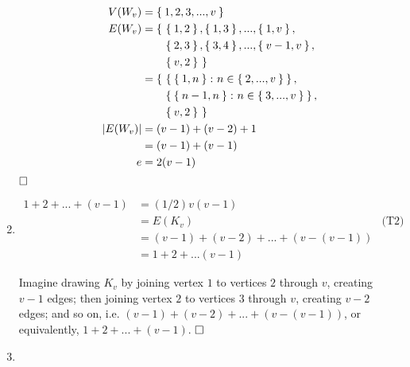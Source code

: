 \documentclass[nobib]{tufte-book}
\DeclarePairedDelimiter\abs{\lvert}{\rvert}
\begin{document}
\begin{enumerate}
  \begin{equation*}
    \begin{split}
      V(W_{v})        &= \Set{ 1, 2, 3, ..., v } \\
      E(W_{v})        &= \{\ \Set{1,2}, \Set{1,3}, ..., \Set{1,v}, \\
                      & \qquad \Set{2,3}, \Set{3,4}, ..., \Set{v-1,v}, \\
                      & \qquad \Set{v,2}\ \} \\
                      &= \{\ \Set{ \Set{1,n} \colon n \in \Set{2,...,v} }, \\
                      & \qquad \Set{ \Set{n-1,n} \colon n \in \Set{3,...,v} }, \\
                      & \qquad \Set{v,2}\ \} \\
      \abs*{E(W_{v})} &= (v-1) + (v-2) + 1 \\
                      & = (v-1) + (v-1) \\
      e               & = 2(v-1)
    \end{split}
  \end{equation*}
  $\hfill\square$

  \newpage

\item
  \begin{align*}
    1 + 2 + ... + (v-1) &= (1/2)v(v-1) \\
    &= E(K_{v}) & \text{(T2)} \\
    &= (v-1) + (v-2) + ... + (v - (v-1)) \\
    &= 1 + 2 + ... (v-1)
  \end{align*}

  Imagine drawing $K_{v}$ by joining vertex $1$ to vertices $2$ through $v$,
  creating $v-1$ edges; then joining vertex $2$ to vertices $3$ through $v$,
  creating $v-2$ edges; and so on, i.e.
  $(v - 1) + (v - 2) + ... + (v - (v - 1))$, or equivalently,
  $1 + 2 + ... + (v - 1)$.
  $\hfill\square$

  \item {}
\end{enumerate}


\end{document}
